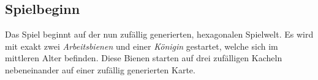\newpage
\subsection{Spielbeginn}
Das Spiel beginnt auf der nun zufällig generierten, hexagonalen Spielwelt. Es wird mit exakt zwei \textit{Arbeitsbienen} und einer \textit{Königin} gestartet, welche sich im mittleren Alter befinden. Diese Bienen starten auf drei zufälligen Kacheln nebeneinander auf einer zufällig generierten Karte.
